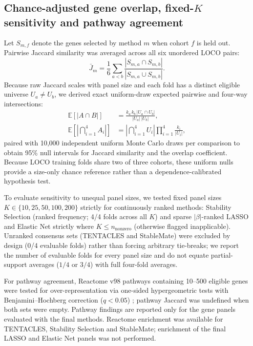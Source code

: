 \subsection{Chance-adjusted gene overlap, fixed-$K$ sensitivity and pathway agreement}
\label{sec:reproducibility_metrics}
Let $S_{m,f}$ denote the genes selected by method $m$ when cohort $f$ is held out. Pairwise Jaccard similarity was averaged across all six unordered LOCO pairs:
\begin{equation}
\bar{J}_m=\frac{1}{6}\sum_{a<b}\frac{|S_{m,a}\cap S_{m,b}|}{|S_{m,a}\cup S_{m,b}|}.
\label{eq:jaccard}
\end{equation}
Because raw Jaccard scales with panel size and each fold has a distinct eligible universe $U_a \neq U_b$, we derived exact uniform-draw expected pairwise and four-way intersections:
\begin{align}
\mathbb{E}[|A \cap B|] &= \frac{k_a \, k_b \, |U_a \cap U_b|}{|U_a| \, |U_b|}, \label{eq:overlap_null_pw}\\
\mathbb{E}\!\left[\left|\bigcap_{i=1}^{4} A_i\right|\right] &= \left|\bigcap_{i=1}^{4} U_i\right| \prod_{i=1}^{4} \frac{k_i}{|U_i|}, \label{eq:overlap_null_4w}
\end{align}
paired with 10,000 independent uniform Monte Carlo draws per comparison to obtain 95\% null intervals for Jaccard similarity and the overlap coefficient. Because LOCO training folds share two of three cohorts, these uniform nulls provide a size-only chance reference rather than a dependence-calibrated hypothesis test.

To evaluate sensitivity to unequal panel sizes, we tested fixed panel sizes $K\in\{10,25,50,100,200\}$ strictly for continuously ranked methods: Stability Selection (ranked frequency; 4/4 folds across all $K$) and sparse $|\beta|$-ranked LASSO and Elastic Net strictly where $K \le n_{\mathrm{nonzero}}$ (otherwise flagged inapplicable). Unranked consensus sets (TENTACLES and StableMate) were excluded by design (0/4 evaluable folds) rather than forcing arbitrary tie-breaks; we report the number of evaluable folds for every panel size and do not equate partial-support averages ($1/4$ or $3/4$) with full four-fold averages.

For pathway agreement, Reactome v98 pathways \cite{ragueneau2026reactome} containing 10--500 eligible genes were tested for over-representation via one-sided hypergeometric tests with Benjamini--Hochberg correction ($q<0.05$) \cite{benjamini1995fdr}; pathway Jaccard was undefined when both sets were empty. Pathway findings are reported only for the gene panels evaluated with the final methods. Reactome enrichment was available for TENTACLES, Stability Selection and StableMate; enrichment of the final LASSO and Elastic Net panels was not performed.
